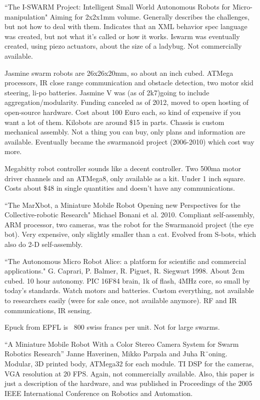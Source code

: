 \documentclass[]{article}
\begin{document}
``The I-SWARM Project: Intelligent Small World Autonomous Robots for Micro-manipulation" \cite{seyfried2005swarm} Aiming for 2x2x1mm volume. Generally describes the challenges, but not how to deal with them. Indicates that an XML behavior spec language was created, but not what it's called or how it works. Iswarm was eventually created, using piezo actuators, about the size of a ladybug. Not commercially available. 

Jasmine swarm robots are 26x26x20mm, so about an inch cubed. ATMega processors, IR close range communication and obstacle detection, two motor skid steering, li-po batteries. Jasmine V was (as of 2k7)going to include aggregation/modularity. Funding canceled as of 2012, moved to open hosting of open-source hardware. Cost about 100 Euro each, so kind of expensive if you want a lot of them. Kilobots are around \$15 in parts. Chassis is custom mechanical assembly. Not a thing you can buy, only plans and information are available. Eventually became the swarmanoid project (2006-2010) which cost way more. 

Megabitty robot controller sounds like a decent controller. Two 500ma motor driver channels and an ATMega8, only available as a kit. Under 1 inch square. Costs about \$48 in single quantities and doesn't have any communications. 

``The MarXbot, a Miniature Mobile Robot Opening new Perspectives for the Collective-robotic Research" \cite{bonani2010marxbot} Michael Bonani et al. 2010. Compliant self-assembly, ARM processor, two cameras, was the robot for the Swarmanoid project (the eye bot). Very expensive, only slightly smaller than a cat. Evolved from S-bots, which also do 2-D self-assembly. 

``The Autonomous Micro Robot Alice: a platform for scientific and commercial applications." \cite{caprari1998autonomous} G. Caprari, P. Balmer, R. Piguet, R. Siegwart 1998. About 2cm cubed. 10 hour autonomy. PIC 16F84 brain, 1k of flash, 4MHz core, so small by today's standards. Watch motors and batteries. Custom everything, not available to researchers easily (were for sale once, not available anymore). RF and IR communications, IR sensing. 

Epuck from EPFL is ~800 swiss francs per unit. Not for large swarms. 

``A Miniature Mobile Robot With a Color Stereo Camera System for Swarm Robotics Research'' \cite{haverinen2005miniature} Janne Haverinen, Mikko Parpala and Juha R¨oning. 
Modular, 3D printed body, ATMega32 for each module. TI DSP for the cameras, VGA resolution at 20 FPS. Again, not commercially available. Also, this paper is just a description of the hardware, and was published in Proceedings of the 2005 IEEE International Conference on Robotics and Automation. 
\end{document}
